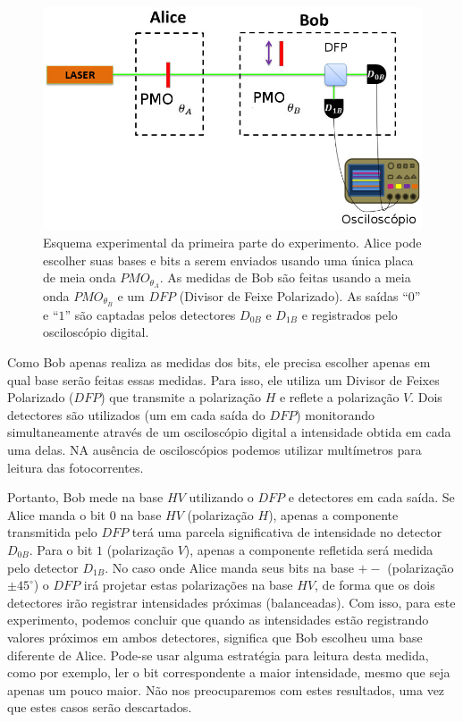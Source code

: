 \documentclass[pra, twocolumn]{revtex4}
\begin{document}
\begin{figure} [H]
     \centering
     \includegraphics[scale=0.7, trim=3cm 1cm 1cm 3cm, clip=true,width =8.5 cm, height=5 cm]{fig2.jpg}
     \caption[Esquema experimental da primeira parte do experimento, sem espionagem. ]{Esquema experimental da primeira parte do experimento. Alice pode escolher suas bases e bits a serem enviados usando uma \'unica placa de meia onda $PMO_{\theta_A}$. As medidas de Bob s\~ao feitas usando a meia onda $PMO_{\theta_B}$ e um $DFP$ (Divisor de Feixe Polarizado). As sa\'idas ``$0$'' e ``$1$'' s\~ao captadas pelos detectores $D_{0B}$ e $D_{1B}$ e registrados pelo oscilosc\'opio digital.}
     \label{exp1}
\end{figure}

Como Bob apenas realiza as medidas dos bits, ele precisa escolher apenas em qual base ser\~ao feitas essas medidas. Para isso, ele utiliza um Divisor de Feixes Polarizado ($DFP$) que transmite a polariza\c c\~ao $H$ e reflete a polariza\c c\~ao $V$. Dois detectores s\~ao utilizados (um em cada sa\'ida do $DFP$) monitorando simultaneamente atrav\'es de um oscilosc\'opio digital a intensidade obtida em cada uma delas. NA aus\^encia de oscilosc\'opios podemos utilizar mult\'imetros para leitura das fotocorrentes.

Portanto, Bob mede na base $HV$ utilizando o $DFP$ e detectores em cada sa\'ida. Se Alice manda o bit $0$ na base $HV$ (polariza\c c\~ao $H$), apenas a componente transmitida pelo $DFP$ ter\'a uma parcela significativa de intensidade  no detector  $D_{0B}$. Para o bit $1$ (polariza\c c\~ao $V$), apenas a componente refletida ser\'a medida pelo detector $D_{1B}$. No caso onde Alice manda seus bits na base $+-$ (polariza\c c\~ao $\pm 45^\circ$) o $DFP$ ir\'a projetar estas polariza\c c\~oes na base $HV$, de forma que os dois detectores ir\~ao registrar intensidades pr\'oximas (balanceadas). Com isso, para este experimento, podemos concluir que quando as intensidades est\~ao registrando valores pr\'oximos em ambos detectores, significa que Bob escolheu uma base diferente de Alice. Pode-se usar alguma estrat\'egia para leitura desta medida, como por exemplo, ler o bit correspondente a maior intensidade, mesmo que seja apenas um pouco maior. N\~ao nos preocuparemos com estes resultados, uma vez que estes casos ser\~ao descartados.  
\end{document}
